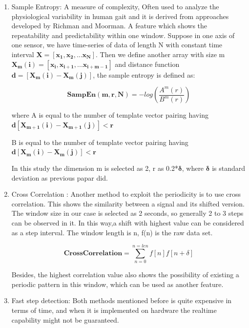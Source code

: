 \documentclass[article]{article}
\begin{document}
	\begin{enumerate}
		\item Sample Entropy: A measure of complexity, Often used to analyze the physiological variability in human gait and it is derived from approaches developed by Richman and Moorman\cite{sammpleE}. A feature which shows the repeatability and predictability within one window. Suppose in one axis of one sensor, we have time-series of data of length N with constant time interval $\mathbf{X={[x_1,x_2,...x_N]}}$. Then we define another array with size m $\mathbf{X_m(i)={[x_i,x_{i+1},...x_{i+m-1}]}}$ and distance function $\mathbf{d =[ X_m(i)-X_m(j)]}$, the sample entropy is defined as:
    
		    \begin{equation}
		        \mathbf{SampEn(m,r,N)} = -log(\frac{A^m(r)}{B^m(r)})
		    \end{equation}
   
   		where A is equal to the number of template vector pairing  having $\mathbf{d[ X_{m+1}(i)-X_{m+1}(j)]<r}$

		B is equal to the number of template vector pairing  having $\mathbf{d[ X_{m}(i)-X_{m}(j)]<r}$
		
		   		
		In this study the dimension m is selected as 2, r as 0.2*$\mathbf{\delta}$, where $\mathbf{\delta}$ is standard deviation as previous papar did\cite{sammpleE}. 
  
		
	\item Cross Correlation : Another method to exploit the periodicity is to use cross correlation. This shows the similarity between a signal and its shifted version. The window size in our case is selected as 2 seconds, so generally 2 to 3 steps can be observed in it. In this way,a shift with highest value can be considered as a step interval. The window length is n, f(n) is the raw data set.
		
		\begin{equation}
		\mathbf{CrossCorrelation} = \sum_{n=0}^{n=len} f[n]f[n+\delta]
		\end{equation}
		
		Besides, the highest correlation value also shows the possibility of existing a periodic pattern in this window, which can be used as another feature.

	\item Fast step detection: Both methods mentioned before is quite expensive in terms of time, and when it is implemented on hardware the realtime capability might not be guaranteed. 
		

\end{enumerate}
\end{document}
